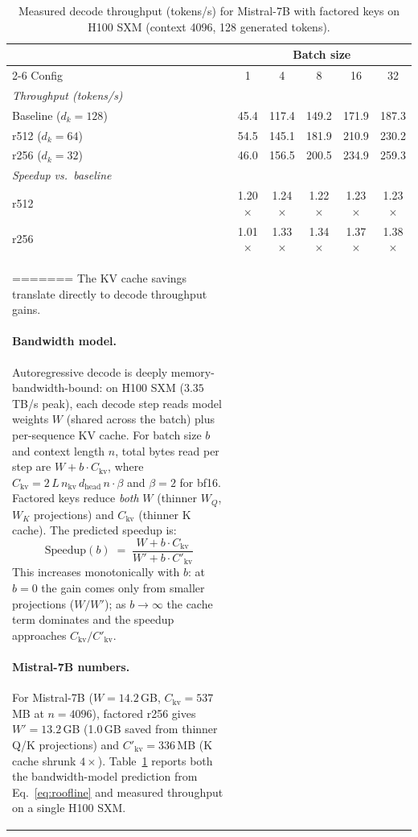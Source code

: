 \documentclass[11pt]{article}
\begin{document}
\begin{table}[h]
\centering
\caption{Measured decode throughput (tokens/s) for Mistral-7B with factored keys on H100 SXM (context 4096, 128 generated tokens).}
\label{tab:decode_throughput}
\small
\begin{tabular}{lccccc}
\toprule
 & \multicolumn{5}{c}{Batch size} \\
\cmidrule(lr){2-6}
Config & 1 & 4 & 8 & 16 & 32 \\
\midrule
\multicolumn{6}{l}{\emph{Throughput (tokens/s)}} \\
\quad Baseline ($d_k\!=\!128$) & 45.4 & 117.4 & 149.2 & 171.9 & 187.3 \\
\quad r512 ($d_k\!=\!64$)      & 54.5 & 145.1 & 181.9 & 210.9 & 230.2 \\
\quad r256 ($d_k\!=\!32$)      & 46.0 & 156.5 & 200.5 & 234.9 & 259.3 \\
\midrule
\multicolumn{6}{l}{\emph{Speedup vs.\ baseline}} \\
\quad r512 & 1.20$\times$ & 1.24$\times$ & 1.22$\times$ & 1.23$\times$ & 1.23$\times$ \\
\quad r256 & 1.01$\times$ & 1.33$\times$ & 1.34$\times$ & 1.37$\times$ & 1.38$\times$ \\
=======
The KV cache savings translate directly to decode throughput gains.

\paragraph{Bandwidth model.}
Autoregressive decode is deeply memory-bandwidth-bound: on H100 SXM ($3.35$\,TB/s peak), each decode step reads model weights $W$ (shared across the batch) plus per-sequence KV cache.
For batch size $b$ and context length $n$, total bytes read per step are $W + b \cdot C_{\mathrm{kv}}$, where $C_{\mathrm{kv}} = 2\, L\, n_{\mathrm{kv}}\, d_{\mathrm{head}}\, n \cdot \beta$ and $\beta = 2$ for bf16.
Factored keys reduce \emph{both} $W$ (thinner $W_Q$, $W_K$ projections) and $C_{\mathrm{kv}}$ (thinner K cache).
The predicted speedup is:
\begin{equation}\label{eq:roofline}
\mathrm{Speedup}(b) \;=\; \frac{W + b \cdot C_{\mathrm{kv}}}{W' + b \cdot C'_{\mathrm{kv}}}
\end{equation}
This increases monotonically with $b$: at $b{=}0$ the gain comes only from smaller projections ($W/W'$); as $b \to \infty$ the cache term dominates and the speedup approaches $C_{\mathrm{kv}}/C'_{\mathrm{kv}}$.

\paragraph{Mistral-7B numbers.}
For Mistral-7B ($W{=}14.2$\,GB, $C_{\mathrm{kv}}{=}537$\,MB at $n{=}4096$), factored r256 gives $W'{=}13.2$\,GB (1.0\,GB saved from thinner Q/K projections) and $C'_{\mathrm{kv}}{=}336$\,MB (K cache shrunk $4\times$).
Table~\ref{tab:decode_throughput} reports both the bandwidth-model prediction from Eq.~\ref{eq:roofline} and measured throughput on a single H100 SXM.


\end{tabular}
\end{table}
\end{document}
